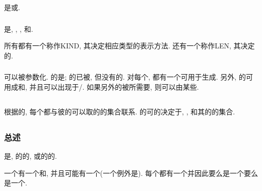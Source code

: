 \Type{}是\IntrinsicType{}或\DerivedType{}.

\subsubsection{\IntrinsicType{}}

\IntrinsicType{}是\IntegerType{}, \RealType{}, \ComplexType{}, \CharacterType{}和\LogicalType{}.

所有\IntrinsicType{}都有一个\Kind{}\TypeParameter{}称作KIND, 其决定相应类型的表示方法. \CharacterType{}还有一个\Length{}\TypeParameter{}称作LEN, 其决定\CharacterString{}的\Length{}.

\subsubsection{\DerivedType{}}

\DerivedType{}可以被参数化. \DerivedType{}的\Scalar{}\Object{}是\Structure{}; \Structure{}的\Assignment{}已被\Intrinsically{}\Define{}, 但没有\Structure{}的\Intrinsic{}\Operation{}. 对每个\DerivedType{}, 都有一个\StructureConstructor{}可用于生成\Value{}. 另外, \DerivedType{}的\Object{}可用成\Procedure{}\Argument{}和\Function{}\Result{}, 并且可以出现于\Input{}/\Output{}\List{}. 如果另外的\Operation{}被\DerivedType{}所需要, 则可以由某些\Procedure{}\Define{}.

\subsection{\Data{}\Value{}}

根据\TypeParameter{}的\Value{}, 每个\IntrinsicType{}都与彼\Type{}的\Data{}可以取的\Value{}的集合联系. \DerivedType{}的\Object{}可\Assume{}的\Value{}决定于\Type{}\Define{}, \TypeParameter{}\Value{}, 和其\Component{}的\Value{}的集合.

\subsection{\Data{}\Entity{}}

\subsubsection{总述}

\Data{}\Entity{}是\Data{}\Object{}, \Expression{}的\Evaluation{}的\Result{}, 或\Function{}\Reference{}的\Execution{}的\Result{}.

一个\Data{}\Entity{}有一个\Type{}和\TypeParameter{}, 并且可能有一个\Data{}\Value{}(一个例外是\Undefined{}\Variable{}). 每个\Data{}\Entity{}都有一个\Rank{}并因此要么是一个\Scalar{}要么是一个\Array{}.

